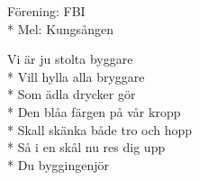 \begin{SongText}[Byggshymnen]
    \begin{SongInfo}
        Förening: FBI\\*%
        Mel: Kungsången
    \end{SongInfo}
    \begin{Verse}
        Vi är ju stolta byggare\\*%
        Vill hylla alla bryggare\\*%
        Som ädla drycker gör\\*%
        Den blåa färgen på vår kropp\\*%
        Skall skänka både tro och hopp\\*%
        Så i en skål nu res dig upp\\*%
        Du byggingenjör
    \end{Verse}
\end{SongText}
